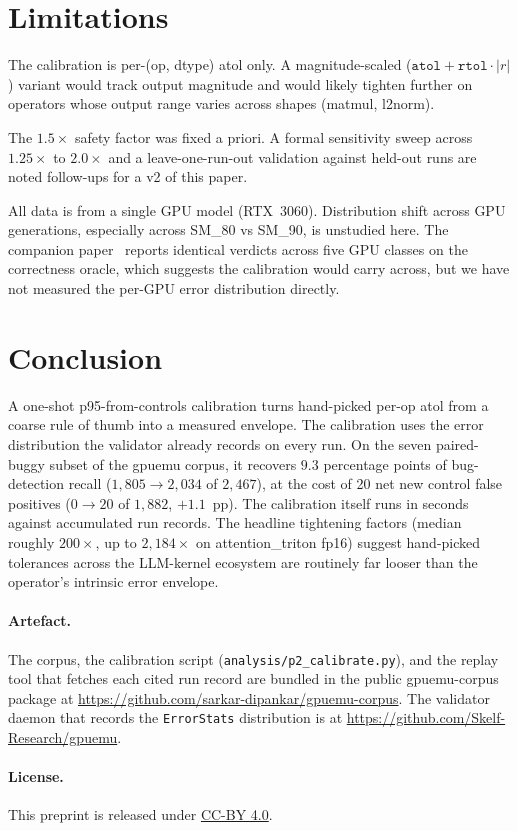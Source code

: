 \documentclass[runningheads]{llncs}
\begin{document}
\section{Limitations}
\label{sec:limitations}

The calibration is per-(op, dtype) atol only. A magnitude-scaled
($\texttt{atol} + \texttt{rtol} \cdot |r|$) variant would track output
magnitude and would likely tighten further on operators whose output
range varies across shapes (matmul, l2norm).

The $1.5\times$ safety factor was fixed a priori. A formal
sensitivity sweep across $1.25\times$ to $2.0\times$ and a
leave-one-run-out validation against held-out runs are noted
follow-ups for a v2 of this paper.

All data is from a single GPU model (RTX~3060). Distribution shift
across GPU generations, especially across SM\_80 vs SM\_90, is
unstudied here. The companion paper~\cite{gpuemuP1} reports
identical verdicts across five GPU classes on the correctness
oracle, which suggests the calibration would carry across, but we
have not measured the per-GPU error distribution directly.

\section{Conclusion}
\label{sec:conclusion}

A one-shot p95-from-controls calibration turns hand-picked per-op
atol from a coarse rule of thumb into a measured envelope. The
calibration uses the error distribution the validator already
records on every run. On the seven paired-buggy subset of the
gpuemu corpus, it recovers $9.3$ percentage points of bug-detection
recall ($1{,}805 \to 2{,}034$ of $2{,}467$), at the cost of 20 net
new control false positives ($0 \to 20$ of $1{,}882$,
$+1.1$~pp). The calibration itself runs in seconds against
accumulated run records. The headline tightening factors (median
roughly $200\times$, up to $2{,}184\times$ on attention\_triton
fp16) suggest hand-picked tolerances across the LLM-kernel
ecosystem are routinely far looser than the operator's intrinsic
error envelope.

\paragraph{Artefact.}
The corpus, the calibration script (\texttt{analysis/p2\_calibrate.py}),
and the replay tool that fetches each cited run record are bundled in
the public \textsf{gpuemu-corpus} package at
\url{https://github.com/sarkar-dipankar/gpuemu-corpus}. The validator
daemon that records the \texttt{ErrorStats} distribution is at
\url{https://github.com/Skelf-Research/gpuemu}.

\paragraph{License.}
This preprint is released under
\href{https://creativecommons.org/licenses/by/4.0/}{CC-BY 4.0}.



\end{document}
